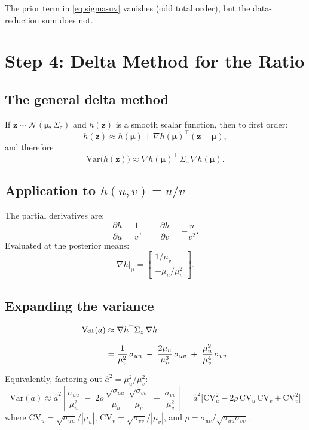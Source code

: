\documentclass[11pt]{article}
\begin{document}
The prior term in \eqref{eq:sigma-uv} vanishes (odd total order), but the data-reduction sum does not.

\section{Step 4: Delta Method for the Ratio}

\subsection{The general delta method}

If $\mathbf{z} \sim \mathcal{N}(\boldsymbol{\mu}, \Sigma_z)$ and $h(\mathbf{z})$ is a smooth scalar function, then to first order:
\[
h(\mathbf{z}) \approx h(\boldsymbol{\mu}) + \nabla h(\boldsymbol{\mu})^\top (\mathbf{z} - \boldsymbol{\mu}),
\]
and therefore
\[
\mathrm{Var}\bigl(h(\mathbf{z})\bigr) \approx \nabla h(\boldsymbol{\mu})^\top \,\Sigma_z\, \nabla h(\boldsymbol{\mu}).
\]

\subsection{Application to $h(u,v) = u/v$}

The partial derivatives are:
\[
\frac{\partial h}{\partial u} = \frac{1}{v}, \qquad
\frac{\partial h}{\partial v} = -\frac{u}{v^2}.
\]
Evaluated at the posterior means:
\[
\nabla h\big|_{\boldsymbol{\mu}} = \begin{bmatrix} 1/\mu_v \\[3pt] -\mu_u/\mu_v^2 \end{bmatrix}.
\]

\subsection{Expanding the variance}

\begin{align}
\mathrm{Var}(a)
&\approx \nabla h^\top \Sigma_z\, \nabla h \notag \\[6pt]
&= \frac{1}{\mu_v^2}\,\sigma_{uu}
\;-\; \frac{2\mu_u}{\mu_v^3}\,\sigma_{uv}
\;+\; \frac{\mu_u^2}{\mu_v^4}\,\sigma_{vv}.
\label{eq:var-a-expanded}
\end{align}

Equivalently, factoring out $\hat{a}^2 = \mu_u^2/\mu_v^2$:
\begin{equation}
\boxed{\;
\mathrm{Var}(a) \approx \hat{a}^2 \left[
\frac{\sigma_{uu}}{\mu_u^2}
\;-\; 2\rho\,\frac{\sqrt{\sigma_{uu}}}{\mu_u}\,\frac{\sqrt{\sigma_{vv}}}{\mu_v}
\;+\; \frac{\sigma_{vv}}{\mu_v^2}
\right]
= \hat{a}^2 \bigl[\mathrm{CV}_u^2 - 2\rho\,\mathrm{CV}_u\,\mathrm{CV}_v + \mathrm{CV}_v^2\bigr]
\;}
\label{eq:var-a-cv}
\end{equation}
where $\mathrm{CV}_u = \sqrt{\sigma_{uu}}/|\mu_u|$, $\mathrm{CV}_v = \sqrt{\sigma_{vv}}/|\mu_v|$, and $\rho = \sigma_{uv}/\sqrt{\sigma_{uu}\sigma_{vv}}$.
\end{document}
